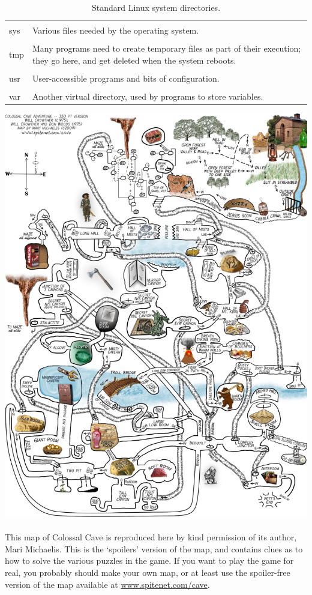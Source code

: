 \begin{table}
\begin{tabular}{lp{12cm}}
& \\
sys & Various files needed by the operating system.\\
& \\
tmp & Many programs need to create temporary files as part of their execution; they go here, and get deleted when the system reboots.\\
& \\
usr & User-accessible programs and bits of configuration.\\
& \\
var & Another virtual directory, used by programs to store variables.\\
\hline
\end{tabular}
\caption{Standard Linux system directories.}\label{table-dirs}
\end{table}

\clearpage
\includegraphics[width=15cm]{images/ColossalCaveAdventureMap}\\
\\
This map of Colossal Cave is reproduced here by kind permission of its author, Mari Michaelis. This is the `spoilers' version of the map, and contains clues as to how to solve the various puzzles in the game. If you want to play the game for real, you probably should make your own map, or at least use the spoiler-free version of the map available at \url{www.spitenet.com/cave}.


